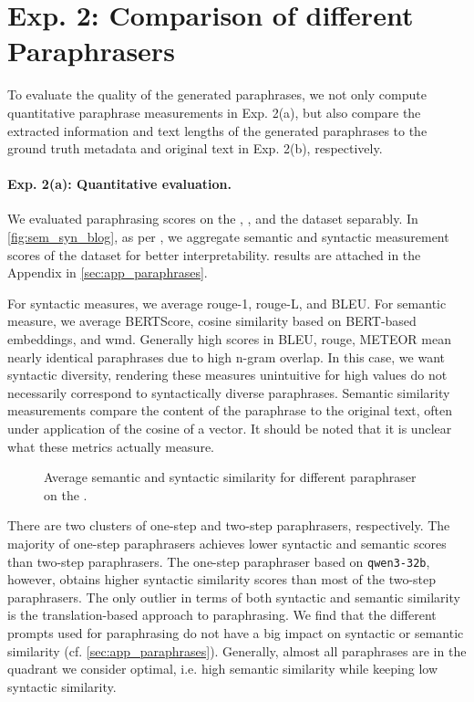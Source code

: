 \section{Exp. 2: Comparison of different Paraphrasers}

To evaluate the quality of the generated paraphrases, we not only compute quantitative paraphrase measurements in Exp. 2(a), but also compare the extracted information and text lengths of the generated paraphrases to the ground truth metadata and original text in Exp. 2(b), respectively.

\paragraph{Exp. 2(a): Quantitative evaluation.}

We evaluated paraphrasing scores on the \dataBlog{}, \dataGutenberg{}, and the \dataStudent{} dataset separably.
In \autoref{fig:sem_syn_blog}, as per \citet{gohsen_captions_2023}, we aggregate semantic and syntactic measurement scores of the \dataBlog{} dataset for better interpretability.
\dataGutenberg{} results are attached in the Appendix in \autoref{sec:app_paraphrases}.

For syntactic measures, we average \ac{rouge}-1, \ac{rouge}-L, and BLEU.
For semantic measure, we average BERTScore, cosine similarity based on BERT-based embeddings, and \ac{wmd}.
Generally high scores in BLEU, \ac{rouge}, METEOR mean nearly identical paraphrases due to high n-gram overlap.
In this case, we want syntactic diversity, rendering these measures unintuitive 
for high values do not necessarily correspond to syntactically diverse paraphrases.
Semantic similarity measurements compare the content of the paraphrase to the original text, 
often under application of the cosine of a vector.
It should be noted that it is unclear what these metrics actually measure.

\begin{figure}[htbp]
    \centering
    
    \caption{Average semantic and syntactic similarity for different paraphraser on the \dataBlog{}.}
    \label{fig:sem_syn_blog}
\end{figure}


There are two clusters of one-step and two-step paraphrasers, respectively.
The majority of one-step paraphrasers achieves lower syntactic and semantic scores than two-step paraphrasers.
The one-step paraphraser based on \texttt{qwen3-32b}, however, obtains higher syntactic similarity scores than most of the two-step paraphrasers.
The only outlier in terms of both syntactic and semantic similarity is the translation-based approach to paraphrasing.
We find that the different prompts used for paraphrasing do not have a big impact on syntactic or semantic similarity (cf. \autoref{sec:app_paraphrases}).
Generally, almost all paraphrases are in the quadrant we consider optimal, i.e. high semantic similarity while keeping low syntactic similarity.


